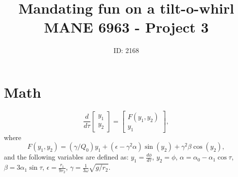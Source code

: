 \documentclass[11pt]{article}
\title{Mandating fun on a tilt-o-whirl\\MANE 6963 - Project 3}
\author{ID: 2168}
\date{}
\begin{document}
\maketitle

\section{Math}

\begin{equation}
\frac{d}{d \tau}
\begin{bmatrix}
y_1\\
y_2
\end{bmatrix}
=
\begin{bmatrix}
F(y_1, y_2) \\
y_1
\end{bmatrix},
\end{equation}
%
where
%
\begin{equation}
F(y_1, y_2) =
(\gamma / Q_0) y_1 +
(\epsilon - \gamma^2 \alpha) \sin (y_2) +
\gamma^2 \beta \cos(y_2),
\end{equation}
%
and the following variables are defined as:
$y_1 = \frac{d \phi}{d \tau}$, $y_2 = \phi$,
$\alpha = \alpha_0 - \alpha_1 \cos \tau$,
$\beta = 3 \alpha_1 \sin \tau$,
$\epsilon = \frac{r_1}{9 r_2}$,
$\gamma = \frac{1}{3 \omega} \sqrt{g / r_2}$.
\end{document}
